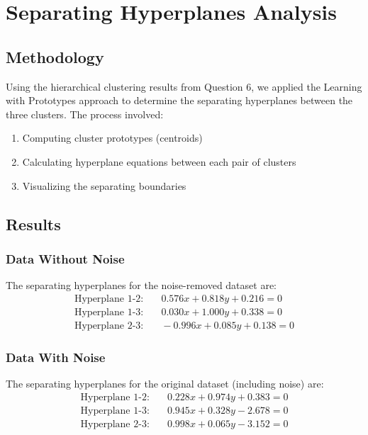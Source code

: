 \documentclass[12pt]{article}
\begin{document}
\section{Separating Hyperplanes Analysis}

\subsection{Methodology}
Using the hierarchical clustering results from Question 6, we applied the Learning with Prototypes approach to determine the separating hyperplanes between the three clusters. The process involved:
\begin{enumerate}
    \item Computing cluster prototypes (centroids)
    \item Calculating hyperplane equations between each pair of clusters
    \item Visualizing the separating boundaries
\end{enumerate}

\subsection{Results}

\subsubsection{Data Without Noise}
The separating hyperplanes for the noise-removed dataset are:
\begin{align*}
    \text{Hyperplane 1-2:} & \quad 0.576x + 0.818y + 0.216 = 0 \\
    \text{Hyperplane 1-3:} & \quad 0.030x + 1.000y + 0.338 = 0 \\
    \text{Hyperplane 2-3:} & \quad -0.996x + 0.085y + 0.138 = 0
\end{align*}

\subsubsection{Data With Noise}
The separating hyperplanes for the original dataset (including noise) are:
\begin{align*}
    \text{Hyperplane 1-2:} & \quad 0.228x + 0.974y + 0.383 = 0 \\
    \text{Hyperplane 1-3:} & \quad 0.945x + 0.328y - 2.678 = 0 \\
    \text{Hyperplane 2-3:} & \quad 0.998x + 0.065y - 3.152 = 0
\end{align*}
\end{document}
